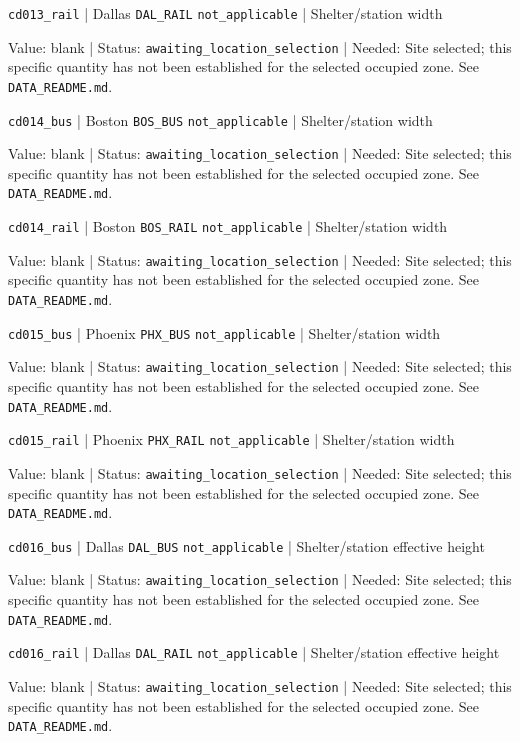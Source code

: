 \nolinkurl{cd013_rail} | Dallas \nolinkurl{DAL_RAIL} \nolinkurl{not_applicable} | Shelter/station width

Value: blank | Status: \nolinkurl{awaiting_location_selection} | Needed: Site selected; this specific quantity has not been established for the selected occupied zone. See \nolinkurl{DATA_README.md}.

\nolinkurl{cd014_bus} | Boston \nolinkurl{BOS_BUS} \nolinkurl{not_applicable} | Shelter/station width

Value: blank | Status: \nolinkurl{awaiting_location_selection} | Needed: Site selected; this specific quantity has not been established for the selected occupied zone. See \nolinkurl{DATA_README.md}.

\nolinkurl{cd014_rail} | Boston \nolinkurl{BOS_RAIL} \nolinkurl{not_applicable} | Shelter/station width

Value: blank | Status: \nolinkurl{awaiting_location_selection} | Needed: Site selected; this specific quantity has not been established for the selected occupied zone. See \nolinkurl{DATA_README.md}.

\nolinkurl{cd015_bus} | Phoenix \nolinkurl{PHX_BUS} \nolinkurl{not_applicable} | Shelter/station width

Value: blank | Status: \nolinkurl{awaiting_location_selection} | Needed: Site selected; this specific quantity has not been established for the selected occupied zone. See \nolinkurl{DATA_README.md}.

\nolinkurl{cd015_rail} | Phoenix \nolinkurl{PHX_RAIL} \nolinkurl{not_applicable} | Shelter/station width

Value: blank | Status: \nolinkurl{awaiting_location_selection} | Needed: Site selected; this specific quantity has not been established for the selected occupied zone. See \nolinkurl{DATA_README.md}.

\nolinkurl{cd016_bus} | Dallas \nolinkurl{DAL_BUS} \nolinkurl{not_applicable} | Shelter/station effective height

Value: blank | Status: \nolinkurl{awaiting_location_selection} | Needed: Site selected; this specific quantity has not been established for the selected occupied zone. See \nolinkurl{DATA_README.md}.

\nolinkurl{cd016_rail} | Dallas \nolinkurl{DAL_RAIL} \nolinkurl{not_applicable} | Shelter/station effective height

Value: blank | Status: \nolinkurl{awaiting_location_selection} | Needed: Site selected; this specific quantity has not been established for the selected occupied zone. See \nolinkurl{DATA_README.md}.

